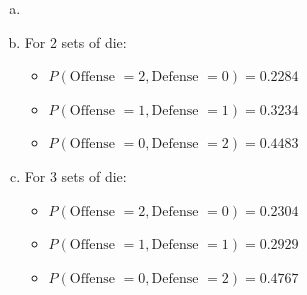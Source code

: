 \documentclass[12pt]{article}
\newenvironment{problem}[2][Problem]{\begin{trivlist}
\item[\hskip \labelsep {\bfseries #1}\hskip \labelsep {\bfseries #2.}]
  \vspace{1 cm}
}{\end{trivlist}}
\begin{document}
\newpage
\begin{problem}{2.83} 
\item
  \begin{enumerate}[a.]
    \item %
      
    \item %
            For 2 sets of die:
      \begin{itemize}
        \item $P(\textrm{Offense } = 2, \textrm{Defense }= 0) = 0.2284$
        \item $P(\textrm{Offense } = 1, \textrm{Defense }= 1) = 0.3234$
        \item $P(\textrm{Offense } = 0, \textrm{Defense }= 2) = 0.4483$
      \end{itemize}
     \item %
            For 3 sets of die:
      \begin{itemize}
        \item $P(\textrm{Offense } = 2, \textrm{Defense }= 0) = 0.2304$
        \item $P(\textrm{Offense } = 1, \textrm{Defense }= 1) = 0.2929$
        \item $P(\textrm{Offense } = 0, \textrm{Defense }= 2) = 0.4767$
      \end{itemize}
  \end{enumerate}
\end{problem}
\end{document}
